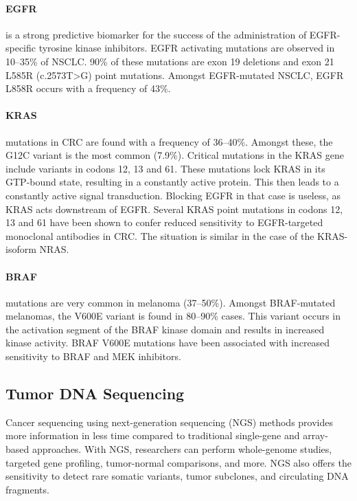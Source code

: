 {{{      \paragraph{EGFR} is a strong predictive biomarker for the success of the
      administration of EGFR-specific tyrosine kinase inhibitors. EGFR
      activating mutations are observed in 10--35\% of NSCLC. 90\% of these
      mutations are exon 19 deletions and exon 21 L585R (c.2573T>G) point
      mutations. Amongst EGFR-mutated NSCLC, EGFR L858R occurs with a frequency
      of 43\%.

      \paragraph{KRAS} mutations in CRC are found with a frequency of 36--40\%.
      Amongst these, the G12C variant is the most common (7.9\%). Critical
      mutations in the KRAS gene include variants in codons 12, 13 and 61. These
      mutations lock KRAS in its GTP-bound state, resulting in a constantly
      active protein. This then leads to a constantly active signal
      transduction. Blocking EGFR in that case is useless, as KRAS acts
      downstream of EGFR. Several KRAS point mutations in codons 12, 13 and 61
      have been shown to confer reduced sensitivity to EGFR-targeted monoclonal
      antibodies in CRC. The situation is similar in the case of the
      KRAS-isoform NRAS.

      \paragraph{BRAF} mutations are very common in melanoma (37--50\%). Amongst
      BRAF-mutated melanomas, the V600E variant is found in 80--90\% cases. This
      variant occurs in the activation segment of the BRAF kinase domain and
      results in increased kinase activity. BRAF V600E mutations have been
      associated with increased sensitivity to BRAF and MEK inhibitors.

  \subsection{Tumor DNA Sequencing}

    Cancer sequencing using next-generation sequencing (NGS) methods provides
    more information in less time compared to traditional single-gene and
    array-based approaches. With NGS, researchers can perform whole-genome
    studies, targeted gene profiling, tumor-normal comparisons, and more. NGS
    also offers the sensitivity to detect rare somatic variants, tumor
    subclones, and circulating DNA fragments.

}}}
